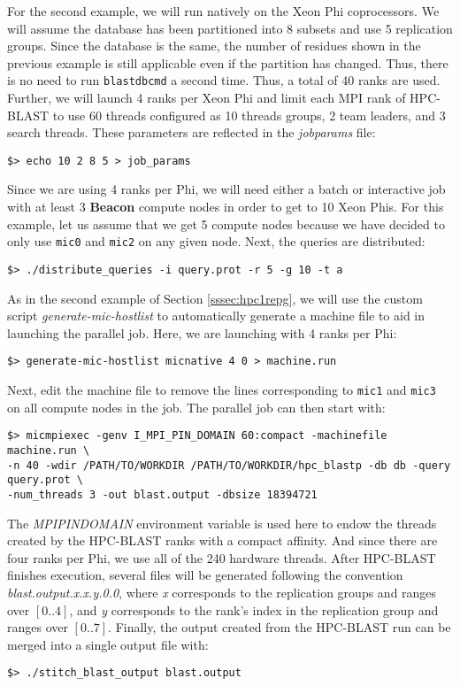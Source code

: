 \documentclass[10pt]{article}
\newcommand{\beac}{\textbf{Beacon }}
\begin{document}
For the second example, we will run natively on the Xeon Phi coprocessors.  We will assume the database has been partitioned into 8 subsets and use 5 replication groups.
Since the database is the same, the number of residues shown in the previous example is still applicable even if the partition has changed. Thus, there is no need to run \verb^blastdbcmd^ a second time.
Thus, a total of 40 ranks are used. Further, we will launch 4 ranks per Xeon Phi and limit each MPI rank of HPC-BLAST to use 60 threads configured as 10 threads groups, 2 team leaders, and 3 search threads.
These parameters are reflected in the \emph{job\textunderscore params} file:
\begin{verbatim}
$> echo 10 2 8 5 > job_params
\end{verbatim}
\noindent Since we are using 4 ranks per Phi, we will need either a batch or interactive job with at least 3 \beac compute nodes in order to get to 10 Xeon Phis.  For this example, let us assume that we get 5 compute nodes because we have decided
to only use \verb^mic0^ and \verb^mic2^ on any given node.  Next, the queries are distributed:
\begin{verbatim}
$> ./distribute_queries -i query.prot -r 5 -g 10 -t a
\end{verbatim}
\noindent As in the second example of Section \ref{sssec:hpc1repg}, we will use the custom script \emph{generate-mic-hostlist} to automatically generate a machine file to aid in launching the parallel job.  Here, we are launching with 4 ranks per Phi:
\begin{verbatim}
$> generate-mic-hostlist micnative 4 0 > machine.run
\end{verbatim}
\noindent Next, edit the machine file to remove the lines corresponding to \verb^mic1^ and \verb^mic3^ on all compute nodes in the job.  The parallel job can then start with:
\begin{verbatim}
$> micmpiexec -genv I_MPI_PIN_DOMAIN 60:compact -machinefile machine.run \
-n 40 -wdir /PATH/TO/WORKDIR /PATH/TO/WORKDIR/hpc_blastp -db db -query query.prot \
-num_threads 3 -out blast.output -dbsize 18394721
\end{verbatim}
\noindent The \emph{MPI\textunderscore PIN\textunderscore DOMAIN} environment variable is used here to endow the threads created by the HPC-BLAST ranks with a compact affinity.  And since there are four ranks per Phi, we use all of the 240 hardware threads.
After HPC-BLAST finishes execution, several files will be generated following the convention 
\emph{blast.output.x.x.y.0.0}, where  \emph{x} corresponds to the replication groups and ranges over \([0..4]\), and \emph{y} corresponds to the rank's index in the replication group
and ranges over \([0..7]\).
Finally, the output created from the HPC-BLAST run can be merged into a single output file with:
\begin{verbatim}
$> ./stitch_blast_output blast.output
\end{verbatim}
\end{document}
